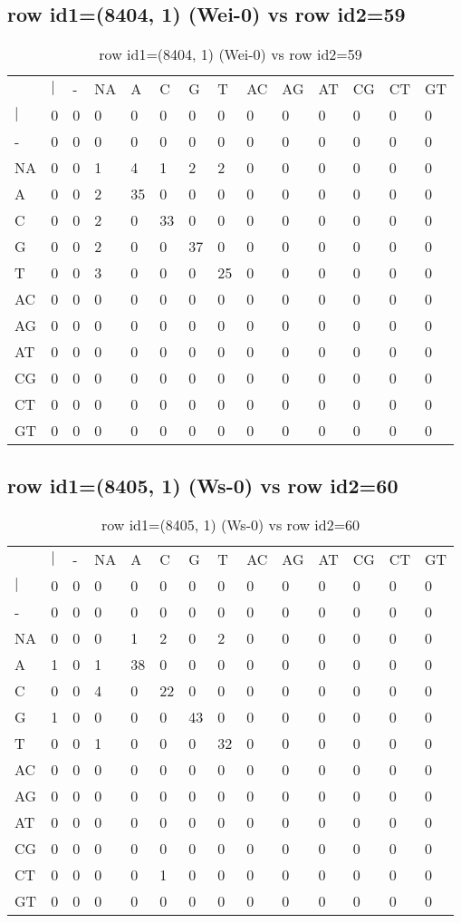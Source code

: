 \subsection{row id1=(8404, 1) (Wei-0) vs row id2=59}
\begin{center}
\begin{longtable}{|l|l|l|l|l|l|l|l|l|l|l|l|l|l|}
\caption{row id1=(8404, 1) (Wei-0) vs row id2=59} \label{table_dm664}\\
\hline
\\
\hline
&$|$&-&NA&A&C&G&T&AC&AG&AT&CG&CT&GT\\
$|$&0&0&0&0&0&0&0&0&0&0&0&0&0\\
-&0&0&0&0&0&0&0&0&0&0&0&0&0\\
NA&0&0&1&4&1&2&2&0&0&0&0&0&0\\
A&0&0&2&35&0&0&0&0&0&0&0&0&0\\
C&0&0&2&0&33&0&0&0&0&0&0&0&0\\
G&0&0&2&0&0&37&0&0&0&0&0&0&0\\
T&0&0&3&0&0&0&25&0&0&0&0&0&0\\
AC&0&0&0&0&0&0&0&0&0&0&0&0&0\\
AG&0&0&0&0&0&0&0&0&0&0&0&0&0\\
AT&0&0&0&0&0&0&0&0&0&0&0&0&0\\
CG&0&0&0&0&0&0&0&0&0&0&0&0&0\\
CT&0&0&0&0&0&0&0&0&0&0&0&0&0\\
GT&0&0&0&0&0&0&0&0&0&0&0&0&0\\
\hline
\end{longtable}
\end{center}

\subsection{row id1=(8405, 1) (Ws-0) vs row id2=60}
\begin{center}
\begin{longtable}{|l|l|l|l|l|l|l|l|l|l|l|l|l|l|}
\caption{row id1=(8405, 1) (Ws-0) vs row id2=60} \label{table_dm666}\\
\hline
\\
\hline
&$|$&-&NA&A&C&G&T&AC&AG&AT&CG&CT&GT\\
$|$&0&0&0&0&0&0&0&0&0&0&0&0&0\\
-&0&0&0&0&0&0&0&0&0&0&0&0&0\\
NA&0&0&0&1&2&0&2&0&0&0&0&0&0\\
A&1&0&1&38&0&0&0&0&0&0&0&0&0\\
C&0&0&4&0&22&0&0&0&0&0&0&0&0\\
G&1&0&0&0&0&43&0&0&0&0&0&0&0\\
T&0&0&1&0&0&0&32&0&0&0&0&0&0\\
AC&0&0&0&0&0&0&0&0&0&0&0&0&0\\
AG&0&0&0&0&0&0&0&0&0&0&0&0&0\\
AT&0&0&0&0&0&0&0&0&0&0&0&0&0\\
CG&0&0&0&0&0&0&0&0&0&0&0&0&0\\
CT&0&0&0&0&1&0&0&0&0&0&0&0&0\\
GT&0&0&0&0&0&0&0&0&0&0&0&0&0\\
\hline
\end{longtable}
\end{center}

